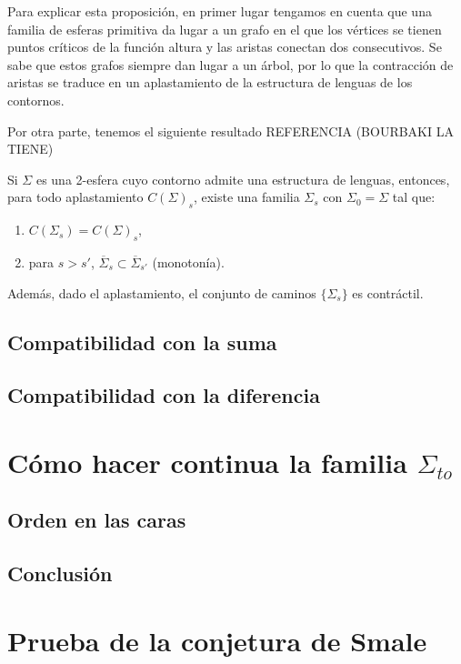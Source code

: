 \documentclass[twoside, 11pt]{article}
\begin{document}
Para explicar esta proposición, en primer lugar tengamos en cuenta que una familia de esferas primitiva da lugar a un grafo en el que los vértices se tienen puntos críticos de la función altura y las aristas conectan dos consecutivos. Se sabe que estos grafos siempre dan lugar a un árbol, por lo que la contracción de aristas se traduce en un aplastamiento de la estructura de lenguas de los contornos. 

Por otra parte, tenemos el siguiente resultado REFERENCIA (BOURBAKI LA TIENE)

\begin{prop}
Si $\Sigma$ es una 2-esfera cuyo contorno admite una estructura de lenguas, entonces, para todo aplastamiento $C(\Sigma)_s$, existe una familia $\Sigma_s$ con $\Sigma_0=\Sigma$ tal que:
\begin{enumerate}
\item $C(\Sigma_s)=C(\Sigma)_s$,
\item para $s>s'$, $\overline{\Sigma}_s\subset\overline{\Sigma}_{s'}$ (monotonía).
\end{enumerate} 
Además, dado el aplastamiento, el conjunto de caminos $\{\Sigma_s\}$ es contráctil. 
\end{prop}

\subsection{Compatibilidad con la suma}
\subsection{Compatibilidad con la diferencia}

\section{Cómo hacer continua la familia $\Sigma_{to}$}
\subsection{Orden en las caras}
\subsection{Conclusión}


\section{Prueba de la conjetura de Smale}
\end{document}
